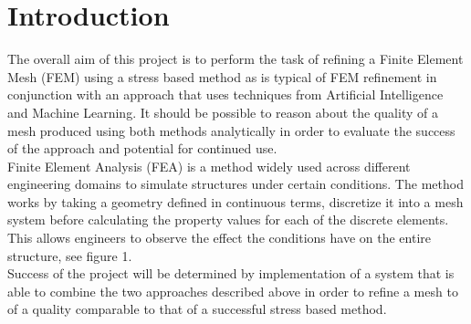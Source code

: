 \section{Introduction}

The overall aim of this project is to perform the task of refining a Finite Element Mesh (FEM) using a stress based method as is typical of FEM refinement in conjunction with an approach that uses techniques from Artificial Intelligence and Machine Learning. It should be possible to reason about the quality of a mesh produced using both methods analytically in order to evaluate the success of the approach and potential for continued use.\\

\noindent
Finite Element Analysis (FEA) is a method widely used across different engineering domains to simulate structures under certain conditions. The method works by taking a geometry defined in continuous terms, discretize it into a mesh system before calculating the property values for each of the discrete elements. This allows engineers to observe the effect the conditions have on the entire structure, see figure 1. \\ 

\noindent
Success of the project will be determined by implementation of a system that is able to combine the two approaches described above in order to refine a mesh to of a quality comparable to that of a successful stress based method.

